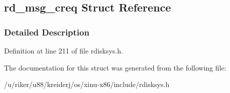 \hypertarget{structrd__msg__creq}{}\subsection{rd\+\_\+msg\+\_\+creq Struct Reference}
\label{structrd__msg__creq}


\subsubsection{Detailed Description}


Definition at line 211 of file rdisksys.\+h.



The documentation for this struct was generated from the following file\+:\begin{DoxyCompactItemize}
\item 
/u/riker/u88/kreiderj/os/xinu-\/x86/include/rdisksys.\+h\end{DoxyCompactItemize}
